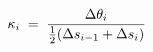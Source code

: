 \documentclass[preview]{standalone}
\begin{document}
\begin{align*}
\special{dvisvgm:raw <g id='unique000'>}\kappa_i \;=\; \dfrac{\Delta\theta_i}{\tfrac{1}{2}(\Delta s_{i-1} + \Delta s_i)}\special{dvisvgm:raw </g>}
\end{align*}
\end{document}
